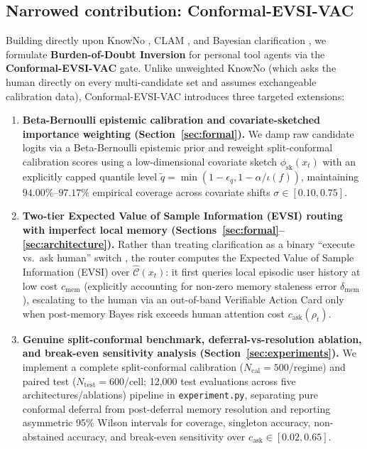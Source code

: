 \documentclass[11pt]{article}
\begin{document}
\subsection{Narrowed contribution: Conformal-EVSI-VAC}

Building directly upon KnowNo \citep{ren2023knowno}, CLAM \citep{kuhn2023clam}, and Bayesian clarification \citep{zhang2024clarify}, we formulate \textbf{Burden-of-Doubt Inversion} for personal tool agents via the \textbf{Conformal-EVSI-VAC} gate. Unlike unweighted KnowNo (which asks the human directly on every multi-candidate set and assumes exchangeable calibration data), Conformal-EVSI-VAC introduces three targeted extensions:
\begin{enumerate}
  \item \textbf{Beta-Bernoulli epistemic calibration and covariate-sketched importance weighting (Section~\ref{sec:formal}).} We damp raw candidate logits via a Beta-Bernoulli epistemic prior and reweight split-conformal calibration scores using a low-dimensional covariate sketch $\phi_{\mathrm{sk}}(x_t)$ with an explicitly capped quantile level $\tilde{q} = \min(1-\epsilon_q,\allowbreak 1-\alpha/\iota(f))$, maintaining $94.00\%$--$97.17\%$ empirical coverage across covariate shifts $\sigma \in [0.10,\allowbreak 0.75]$.
  \item \textbf{Two-tier Expected Value of Sample Information (EVSI) routing with imperfect local memory (Sections~\ref{sec:formal}--\ref{sec:architecture}).} Rather than treating clarification as a binary ``execute vs.\ ask human'' switch \citep{ren2023knowno}, the router computes the Expected Value of Sample Information (EVSI) over $\hat{\mathcal{C}}(x_t)$: it first queries local episodic user history at low cost $c_{\mathrm{mem}}$ (explicitly accounting for non-zero memory staleness error $\delta_{\mathrm{mem}}$), escalating to the human via an out-of-band Verifiable Action Card \citep{breckenridge2026ihitl} only when post-memory Bayes risk exceeds human attention cost $c_{\mathrm{ask}}(\rho_t)$.
  \item \textbf{Genuine split-conformal benchmark, deferral-vs-resolution ablation, and break-even sensitivity analysis (Section~\ref{sec:experiments}).} We implement a complete split-conformal calibration ($N_{\mathrm{cal}}=500$/regime) and paired test ($N_{\mathrm{test}}=600$/cell; 12{,}000 test evaluations across five architectures/ablations) pipeline in \texttt{experiment.\linebreak[0]py}, separating pure conformal deferral from post-deferral memory resolution and reporting asymmetric 95\% Wilson intervals for coverage, singleton accuracy, non-abstained accuracy, and break-even sensitivity over $c_{\mathrm{ask}} \allowbreak \in [0.02,\allowbreak 0.65]$.
\end{enumerate}
\end{document}
